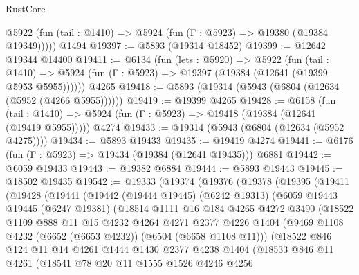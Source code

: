 \begin{lexlean}{RustCore}
\begin{coremodule}
      @5922 (fun (tail : @1410) => @5924 (fun (Γ : @5923) => @19380 (@19384 @19349)))))
    @1494
@19397 := @5893 (@19314 @18452)
@19399 := @12642 @19344 @14400
@19411 := @6134
    (fun (lets : @5920) =>
    @5922
      (fun (tail : @1410) =>
      @5924 (fun (Γ : @5923) => @19397 (@19384 (@12641 (@19399 @5953 @5955))))))
    @4265
@19418 := @5893 (@19314 (@5943 (@6804 (@12634 (@5952 (@4266 @5955))))))
@19419 := @19399 @4265
@19428 := @6158
    (fun (tail : @1410) => @5924 (fun (Γ : @5923) => @19418 (@19384 (@12641 (@19419 @5955)))))
    @4274
@19433 := @19314 (@5943 (@6804 (@12634 (@5952 @4275))))
@19434 := @5893 @19433
@19435 := @19419 @4274
@19441 := @6176 (fun (Γ : @5923) => @19434 (@19384 (@12641 @19435))) @6881
@19442 := @6059 @19433
@19443 := @19382 @6884
@19444 := @5893 @19443
@19445 := @18502 @19435
@19542 := @19333
    (@19374
      (@19376
        (@19378
          (@19395
            (@19411
              (@19428
                (@19441
                  (@19442
                    (@19444 @19445)
                    (@6242 @19313)
                    (@6059
                      @19443
                      @19445
                      (@6247 @19381)
                      (@18514
                        @1111
                        @16
                        @184
                        @4265
                        @4272
                        @3490
                        (@18522
                          @1109
                          @888
                          @11
                          @15
                          @4232
                          @4264
                          @4271
                          @2377
                          @4226
                          @1404
                          (@9469 @1108 @4232 (@6652 (@6653 @4232)) (@6504 (@6658 @1108 @11)))
                          (@18522
                            @846
                            @124
                            @11
                            @14
                            @4261
                            @1444
                            @1430
                            @2377
                            @4238
                            @1404
                            (@18533
                              @846
                              @11
                              @4261
                              (@18541
                                @78
                                @20
                                @11
                                @1555
                                @1526
                                @4246
                                @4256

\end{coremodule}
\end{lexlean}
